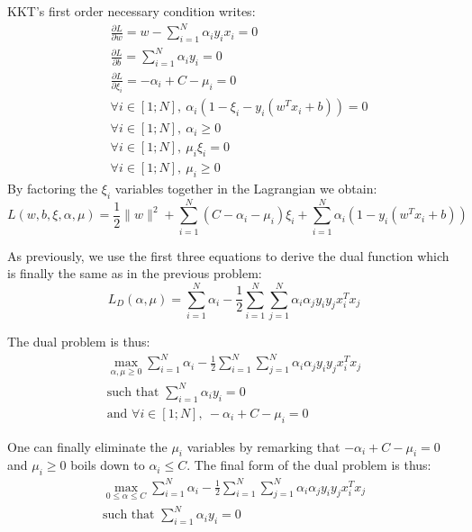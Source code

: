\documentclass{article}
\begin{document}
KKT's first order necessary condition writes:
\begin{align*}
&\frac{\partial L}{\partial w} = w - \sum_{i=1}^N \alpha_i y_i x_i = 0\\
&\frac{\partial L}{\partial b} = \sum_{i=1}^N \alpha_i y_i = 0\\
&\frac{\partial L}{\partial \xi_i} = -\alpha_i + C - \mu_i = 0\\
&\forall i\in [1;N], \ \alpha_i\left(1-\xi_i-y_i\left( w^Tx_i + b \right)\right) = 0\\
&\forall i\in [1;N], \ \alpha_i \geq 0\\
&\forall i\in [1;N], \ \mu_i\xi_i = 0\\
&\forall i\in [1;N], \ \mu_i \geq 0
\end{align*}
By factoring the $\xi_i$ variables together in the Lagrangian we obtain:
\begin{equation*}
L(w,b,\xi,\alpha, \mu) = \frac{1}{2} \|w\|^2 + \sum_{i=1}^N (C-\alpha_i-\mu_i)\xi_i + \sum_{i=1}^N \alpha_i\left(1-y_i\left( w^Tx_i + b \right)\right)
\end{equation*}

As previously, we use the first three equations to derive the dual function which is finally the same as in the previous problem:
\begin{equation*}
L_D(\alpha, \mu) = \sum_{i=1}^N \alpha_i - \frac{1}{2} \sum_{i=1}^N \sum_{j=1}^N  \alpha_i \alpha_j y_i y_j x_i^T x_j
\end{equation*}

The dual problem is thus:
\begin{gather*}
\max_{\alpha, \mu\geq 0} \sum_{i=1}^N \alpha_i - \frac{1}{2} \sum_{i=1}^N \sum_{j=1}^N  \alpha_i \alpha_j y_i y_j x_i^T x_j\\
\text{such that } \sum_{i=1}^N \alpha_i y_i = 0\\
\text{and }\forall i\in [1;N], \ -\alpha_i + C - \mu_i = 0
\end{gather*}

One can finally eliminate the $\mu_i$ variables by remarking that $-\alpha_i + C - \mu_i = 0$ and $\mu_i\geq 0$ boils down to $\alpha_i\leq C$. The final form of the dual problem is thus:
\begin{gather*}
\max_{0\leq\alpha\leq C} \sum_{i=1}^N \alpha_i - \frac{1}{2} \sum_{i=1}^N \sum_{j=1}^N  \alpha_i \alpha_j y_i y_j x_i^T x_j\\
\text{such that } \sum_{i=1}^N \alpha_i y_i = 0
\end{gather*}
\end{document}

